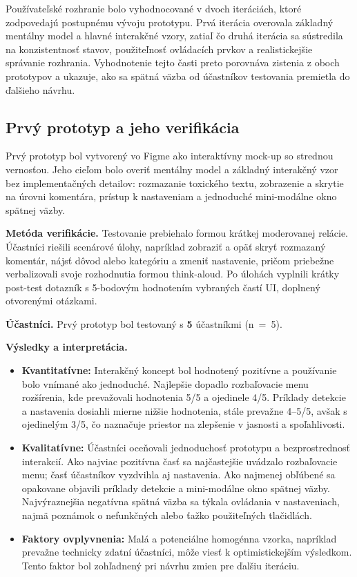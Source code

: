 Používateľské rozhranie bolo vyhodnocované v dvoch iteráciách, ktoré zodpovedajú postupnému vývoju prototypu. Prvá iterácia overovala základný mentálny model a hlavné interakčné vzory, zatiaľ čo druhá iterácia sa sústredila na konzistentnosť stavov, použiteľnosť ovládacích prvkov a realistickejšie správanie rozhrania. Vyhodnotenie tejto časti preto porovnáva zistenia z oboch prototypov a ukazuje, ako sa spätná väzba od účastníkov testovania premietla do ďalšieho návrhu.

\subsection{Prvý prototyp a jeho verifikácia}
Prvý prototyp bol vytvorený vo Figme ako interaktívny mock-up so strednou vernosťou. Jeho cieľom bolo overiť mentálny model a základný interakčný vzor bez implementačných detailov: rozmazanie toxického textu, zobrazenie a skrytie na úrovni komentára, prístup k nastaveniam a jednoduché mini-modálne okno spätnej väzby.

\textbf{Metóda verifikácie.} Testovanie prebiehalo formou krátkej moderovanej relácie. Účastníci riešili scenárové úlohy, napríklad zobraziť a opäť skryť rozmazaný komentár, nájsť dôvod alebo kategóriu a zmeniť nastavenie, pričom priebežne verbalizovali svoje rozhodnutia formou think-aloud. Po úlohách vyplnili krátky post-test dotazník s 5-bodovým hodnotením vybraných častí UI, doplnený otvorenými otázkami.

\textbf{Účastníci.} Prvý prototyp bol testovaný s \textbf{5} účastníkmi (n~=~5).

\textbf{Výsledky a interpretácia.}
\begin{itemize}
  \item \textbf{Kvantitatívne:} Interakčný koncept bol hodnotený pozitívne a používanie bolo vnímané ako jednoduché. Najlepšie dopadlo rozbaľovacie menu rozšírenia, kde prevažovali hodnotenia 5/5 a ojedinele 4/5. Príklady detekcie a nastavenia dosiahli mierne nižšie hodnotenia, stále prevažne 4--5/5, avšak s ojedinelým 3/5, čo naznačuje priestor na zlepšenie v jasnosti a spoľahlivosti.
  \item \textbf{Kvalitatívne:} Účastníci oceňovali jednoduchosť prototypu a bezprostrednosť interakcií. Ako najviac pozitívna časť sa najčastejšie uvádzalo rozbaľovacie menu; časť účastníkov vyzdvihla aj nastavenia. Ako najmenej obľúbené sa opakovane objavili príklady detekcie a mini-modálne okno spätnej väzby. Najvýraznejšia negatívna spätná väzba sa týkala ovládania v nastaveniach, najmä poznámok o nefunkčných alebo ťažko použiteľných tlačidlách.
  \item \textbf{Faktory ovplyvnenia:} Malá a potenciálne homogénna vzorka, napríklad prevažne technicky zdatní účastníci, môže viesť k optimistickejším výsledkom. Tento faktor bol zohľadnený pri návrhu zmien pre ďalšiu iteráciu.
\end{itemize}

